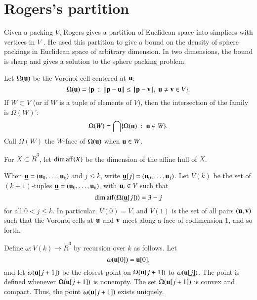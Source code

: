 \section{Rogers's partition}\label{sec:rogers}





Given a packing $ V$, Rogers gives a partition of Euclidean space into
simplices with vertices in $ V$ \cite{Rogers:1958:Packing}.   He used this partition
to give a bound on the density of sphere packings in Euclidean space of arbitrary dimension.
In two dimensions, the bound is sharp and gives a solution to the sphere packing problem.

Let $\Omega( {\mathbf u})$  be the Voronoi cell centered at $ {\mathbf u}$:
\begin{displaymath}
  \Omega( {\mathbf u}) = \{{\mathbf p} \ :\   {\hskip0.1em|\hskip-0.15em|\hskip0.1em}{\mathbf p} -  {\mathbf u}{\hskip0.1em|\hskip-0.15em|\hskip0.1em} 
\le {\hskip0.1em|\hskip-0.15em|\hskip0.1em}{\mathbf p} - {\mathbf v}{\hskip0.1em|\hskip-0.15em|\hskip0.1em},\  {\mathbf u}\ne{\mathbf v}\in V\}.
\end{displaymath}
If $W\subset V$ (or if $W$ is a tuple of elements of $ V$), 
then the intersection of the family is  $\Omega(W)$':
\begin{displaymath}\Omega(W)  = \bigcap \{\Omega( {\mathbf u})\ :\   {\mathbf u}\in W \}.\end{displaymath}
Call $\Omega(W)$ the $W$-face of $\Omega( {\mathbf u})$ when $ {\mathbf u}\in W$.

For $X\subset\ring{R}^3$,  let $\operatorname{dim\,aff}(X)$ be the dimension of the affine hull
of $X$.

When ${\underline{{\mathbf u}}}=( {\mathbf u}_0,\ldots, {\mathbf u}_k)$ and $j\le k$, write ${\underline{{\mathbf u}}}[j] = ( {\mathbf u}_0,\ldots, {\mathbf u}_j)$.
Let $ V(k)$ be the set of $(k\!+\!1)$-tuples ${\underline{{\mathbf u}}}=( {\mathbf u}_0,\ldots, {\mathbf u}_k)$, with
$ {\mathbf u}_i\in V$ such
that 
\begin{equation}\label{eqn:omega-dim}
\operatorname{dim\,aff}(\Omega({\underline{{\mathbf u}}}[j])) = 3-j
\end{equation}
for all $0<j\le k$.
In particular, $ V(0)= V$,   and $ V(1)$ is the
set of all pairs $( {\mathbf u},{\mathbf v})$ such that the Voronoi cells at $ {\mathbf u}$ and ${\mathbf v}$ meet along
a face of codimension $1$, and
so forth.


Define $\omega: V(k)\to \ring{R}^3$ by recursion over $k$ as follows.
Let \begin{displaymath}\omega( {\mathbf u}[0]) =  {\mathbf u}[0],\end{displaymath}
and let $\omega( {\mathbf u}[j+1])$ be the closest point on $\Omega( {\mathbf u}[j+1])$ to $\omega( {\mathbf u}[j])$.  The point is defined whenever $\Omega( {\mathbf u}[j+1])$ is nonempty.
The set $\Omega( {\mathbf u}[j+1])$ is convex and compact.  Thus, the point $\omega( {\mathbf u}[j+1])$ exists
uniquely.
%

